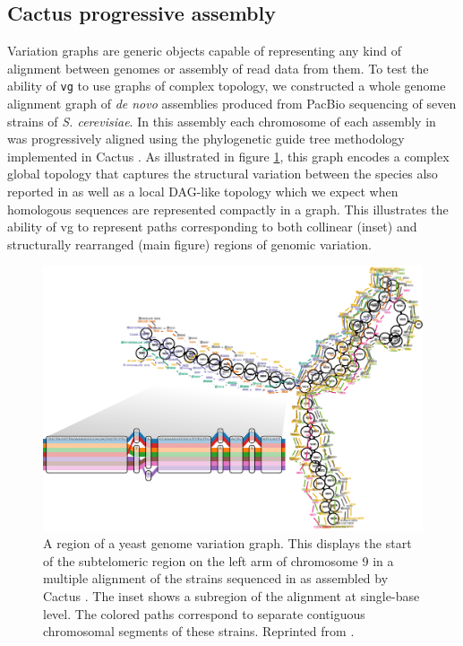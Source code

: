 \subsection{Cactus progressive assembly}
\label{sec:yeast_cactus}

Variation graphs are generic objects capable of representing any kind of alignment between genomes or assembly of read data from them.
To test the ability of {\tt vg} to use graphs of complex topology, we constructed a whole genome alignment graph of \emph{de novo} assemblies produced from PacBio sequencing of seven strains of \emph{S. cerevisiae}.
In this assembly each chromosome of each assembly in \cite{yue2017contrasting} was progressively aligned using the phylogenetic guide tree methodology implemented in Cactus \cite{Paten:2011fva}.
As illustrated in figure \ref{fig:cactus_yeast_zoom}, this graph encodes a complex global topology that captures the structural variation between the species also reported in \cite{yue2017contrasting} as well as a local DAG-like topology which we expect when homologous sequences are represented compactly in a graph.
This illustrates the ability of vg to represent paths corresponding to both collinear (inset) and structurally rearranged (main figure) regions of genomic variation.

\begin{figure}[htbp!]
  \centering
  \includegraphics[width=1.0\textwidth]{Chapter3/Figs/cactus_yeast_zoom.pdf}
  \caption[Cactus yeast variation graph]{
  A region of a yeast genome variation graph.
  This displays the start of the subtelomeric region on the left arm of chromosome 9 in a multiple alignment of the strains sequenced in \cite{yue2017contrasting} as assembled by Cactus \cite{Paten:2011fva}.
  The inset shows a subregion of the alignment at single-base level.
  The colored paths correspond to separate contiguous chromosomal segments of these strains.
  Reprinted from \cite{garrison2018variation}.
  }
  \label{fig:cactus_yeast_zoom}
\end{figure}

